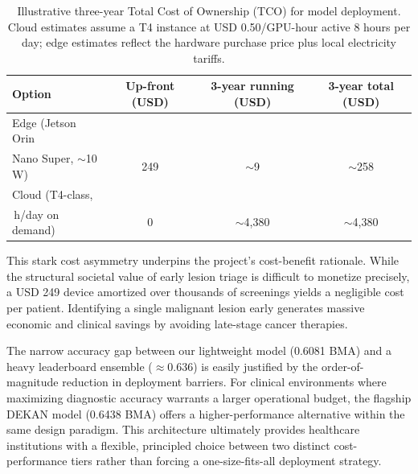 \begin{table}[H]
\centering
\caption{Illustrative three-year Total Cost of Ownership (TCO) for model deployment. Cloud estimates assume a T4 instance at USD 0.50/GPU-hour active 8 hours per day; edge estimates reflect the hardware purchase price plus local electricity tariffs.}
\label{tab:tco}
\small
\begin{tabularx}{\textwidth}{>{\raggedright\arraybackslash}Xccc}
\toprule
Option & Up-front (USD) & 3-year running (USD) & 3-year total (USD) \\
\midrule
Edge (Jetson Orin\\ Nano Super, $\sim$10\,W) & 249 & $\sim$9   & $\sim$258 \\
Cloud (T4-class,\\ 8\,h/day on demand)        & 0   & $\sim$4{,}380 & $\sim$4{,}380 \\
\bottomrule
\end{tabularx}
\end{table}

This stark cost asymmetry underpins the project's cost-benefit rationale. While the structural societal value of early lesion triage is difficult to monetize precisely, a USD 249 device amortized over thousands of screenings yields a negligible cost per patient. Identifying a single malignant lesion early generates massive economic and clinical savings by avoiding late-stage cancer therapies. 

The narrow accuracy gap between our lightweight model (0.6081 BMA) and a heavy leaderboard ensemble ($\approx$0.636) is easily justified by the order-of-magnitude reduction in deployment barriers. For clinical environments where maximizing diagnostic accuracy warrants a larger operational budget, the flagship DEKAN model (0.6438 BMA) offers a higher-performance alternative within the same design paradigm. This architecture ultimately provides healthcare institutions with a flexible, principled choice between two distinct cost-performance tiers rather than forcing a one-size-fits-all deployment strategy.